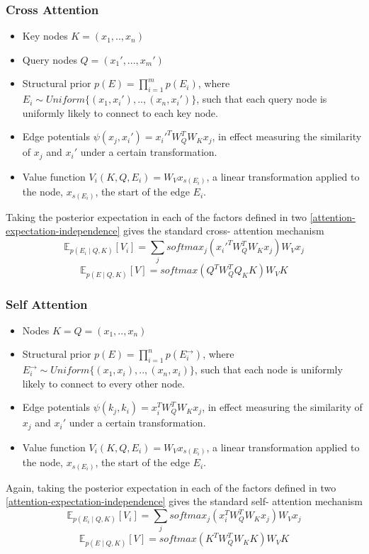 \documentclass{article}
\theoremstyle{plain}
\theoremstyle{definition}
\theoremstyle{remark}
\begin{document}
\subsubsection{Cross Attention}
\begin{itemize}
    \item Key nodes  $K =(x_1,..,x_n)$
    \item Query nodes $Q = (x_1',...,x_m')$
    \item Structural prior $p(E) = \prod_{i=1}^m p(E_i)$, where $E_i \sim Uniform\{(x_1, x_i'),..,(x_n, x_i')\}$, such that each query node is uniformly likely to connect to each key node.
    \item Edge potentials $\psi(x_j, x_i')=x_i'^TW_{Q}^TW_{K}x_j$, in effect measuring the similarity of $x_j$ and $x_i'$ under a certain transformation.
    \item Value function $V_i(K, Q, E_i) = W_V x_{s(E_i)}$, a linear transformation applied to the node, $x_{s(E_i)}$, the start of the edge $E_i$.
\end{itemize}
Taking the posterior expectation in each of the factors defined in two \eqref{attention-expectation-independence} gives the standard cross- attention mechanism
$$\mathbb{E}_{p(E_i\mid Q, K)}[V_i] =  \sum_{j} softmax_j(x_i'^TW_{Q}^TW_{K}x_j)W_{V} x_j$$
$$\mathbb{E}_{p(E\mid Q, K)}[V] =  softmax(Q^TW_Q^TQ_KK)W_VK$$

\subsubsection{Self Attention}
\begin{itemize}
    \item Nodes  $K = Q = (x_1,..,x_n)$
    \item Structural prior $p(E) = \prod_{i=1}^n p(E_i^{\rightarrow})$, where $E_i^{\rightarrow} \sim Uniform\{(x_1, x_i),..,(x_n, x_i)\}$, such that each node is uniformly likely to connect to every other node.
    \item Edge potentials $\psi(k_j, k_i)=x_i^TW_{Q}^TW_{K}x_j$, in effect measuring the similarity of $x_j$ and $x_i'$ under a certain transformation.
    \item Value function $V_i(K, Q, E_i) = W_V x_{s(E_i)}$, a linear transformation applied to the node, $x_{s(E_i)}$, the start of the edge $E_i$.
\end{itemize}
Again, taking the posterior expectation in each of the factors defined in two \eqref{attention-expectation-independence} gives the standard self- attention mechanism
$$\mathbb{E}_{p(E_i\mid Q, K)}[V_i] =  \sum_{j} softmax_j(x_i^TW_{Q}^TW_{K}x_j)W_{V} x_j$$
$$\mathbb{E}_{p(E\mid Q, K)}[V] =  softmax(K^TW_Q^TW_KK)W_VK$$
\end{document}
